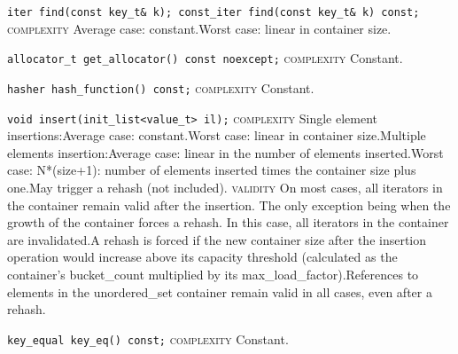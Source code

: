 \noindent{}\hspace*{0.25em}\lstinline[basicstyle=\ttfamily\color{corange}]{iter find(const key_t& k); const_iter find(const key_t& k) const;} \textsc{complexity} Average case: constant.Worst case: linear in container size.\\\vspace{-0.6em}

\noindent{}\hspace*{0.25em}\lstinline[basicstyle=\ttfamily\color{cgreen}]{allocator_t get_allocator() const noexcept;} \textsc{complexity} Constant.\\\vspace{-0.6em}

\noindent{}\hspace*{0.25em}\lstinline[basicstyle=\ttfamily\color{cgreen}]{hasher hash_function() const;} \textsc{complexity} Constant.\\\vspace{-0.6em}

\noindent{}\hspace*{0.25em}\lstinline[basicstyle=\ttfamily\color{corange}]{void insert(init_list<value_t> il);} \textsc{complexity} Single element insertions:Average case: constant.Worst case: linear in container size.Multiple elements insertion:Average case: linear in the number of elements inserted.Worst case: N*(size+1): number of elements inserted times the container size plus one.May trigger a rehash (not included). \textsc{validity} On most cases, all iterators in the container remain valid after the insertion. The only exception being when the growth of the container forces a rehash. In this case, all iterators in the container are invalidated.A rehash is forced if the new container size after the insertion operation would increase above its capacity threshold (calculated as the container's bucket\_count multiplied by its max\_load\_factor).References to elements in the unordered\_set container remain valid in all cases, even after a rehash.\\\vspace{-0.6em}

\noindent{}\hspace*{0.25em}\lstinline[basicstyle=\ttfamily\color{cgreen}]{key_equal key_eq() const;} \textsc{complexity} Constant.\\\vspace{-0.6em}

